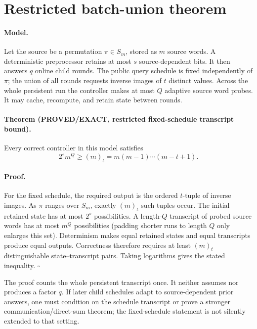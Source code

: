 \documentclass[11pt]{article}
\newcommand{\EXACT}{\textbf{PROVED/EXACT}}
\begin{document}
\section{Restricted batch-union theorem}
\paragraph{Model.}
Let the source be a permutation $\pi\in S_m$, stored as $m$ source words.  A
deterministic preprocessor retains at most $s$ source-dependent bits.  It then
answers $q$ online child rounds.  The public query schedule is fixed independently
of $\pi$; the union of all rounds requests inverse images of $t$ distinct values.
Across the whole persistent run the controller makes at most $Q$ adaptive source
word probes.  It may cache, recompute, and retain state between rounds.

\paragraph{Theorem (\EXACT, restricted fixed-schedule transcript bound).}
Every correct controller in this model satisfies
\[
  2^s m^Q\ge (m)_t=m(m-1)\cdots(m-t+1).
\]

\paragraph{Proof.}
For the fixed schedule, the required output is the ordered $t$-tuple of inverse
images.  As $\pi$ ranges over $S_m$, exactly $(m)_t$ such tuples occur.  The
initial retained state has at most $2^s$ possibilities.  A length-$Q$ transcript
of probed source words has at most $m^Q$ possibilities (padding shorter runs to
length $Q$ only enlarges this set).  Determinism makes equal retained states and
equal transcripts produce equal outputs.  Correctness therefore requires at
least $(m)_t$ distinguishable state--transcript pairs.  Taking logarithms gives
the stated inequality.  \hfill$\square$

The proof counts the whole persistent transcript once.  It neither assumes nor
produces a factor $q$.  If later child schedules adapt to source-dependent prior
answers, one must condition on the schedule transcript or prove a stronger
communication/direct-sum theorem; the fixed-schedule statement is not silently
extended to that setting.
\end{document}
